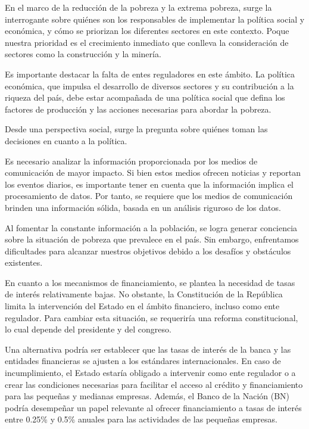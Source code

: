 \documentclass[
  letterpaper,
  DIV=11,
  numbers=noendperiod]{scrartcl}
\begin{document}
En el marco de la reducción de la pobreza y la extrema pobreza, surge la
interrogante sobre quiénes son los responsables de implementar la
política social y económica, y cómo se priorizan los diferentes sectores
en este contexto. Poque nuestra prioridad es el crecimiento inmediato
que conlleva la consideración de sectores como la construcción y la
minería.

Es importante destacar la falta de entes reguladores en este ámbito. La
política económica, que impulsa el desarrollo de diversos sectores y su
contribución a la riqueza del país, debe estar acompañada de una
política social que defina los factores de producción y las acciones
necesarias para abordar la pobreza.

Desde una perspectiva social, surge la pregunta sobre quiénes toman las
decisiones en cuanto a la política.

Es necesario analizar la información proporcionada por los medios de
comunicación de mayor impacto. Si bien estos medios ofrecen noticias y
reportan los eventos diarios, es importante tener en cuenta que la
información implica el procesamiento de datos. Por tanto, se requiere
que los medios de comunicación brinden una información sólida, basada en
un análisis riguroso de los datos.

Al fomentar la constante información a la población, se logra generar
conciencia sobre la situación de pobreza que prevalece en el país. Sin
embargo, enfrentamos dificultades para alcanzar nuestros objetivos
debido a los desafíos y obstáculos existentes.

En cuanto a los mecanismos de financiamiento, se plantea la necesidad de
tasas de interés relativamente bajas. No obstante, la Constitución de la
República limita la intervención del Estado en el ámbito financiero,
incluso como ente regulador. Para cambiar esta situación, se requeriría
una reforma constitucional, lo cual depende del presidente y del
congreso.

Una alternativa podría ser establecer que las tasas de interés de la
banca y las entidades financieras se ajusten a los estándares
internacionales. En caso de incumplimiento, el Estado estaría obligado a
intervenir como ente regulador o a crear las condiciones necesarias para
facilitar el acceso al crédito y financiamiento para las pequeñas y
medianas empresas. Además, el Banco de la Nación (BN) podría desempeñar
un papel relevante al ofrecer financiamiento a tasas de interés entre
0.25\% y 0.5\% anuales para las actividades de las pequeñas empresas.
\end{document}
